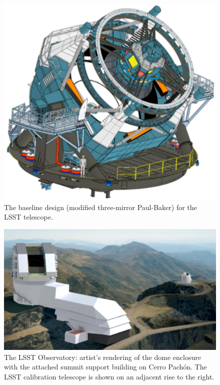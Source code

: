 \documentclass{emulateapj}
\begin{document}
\begin{figure}
\vskip -0.65in
\includegraphics[width=1.0\hsize,clip]{telescopeGreen.pdf}
\vskip -0.65in
\caption{The baseline design (modified three-mirror Paul-Baker) for the 
LSST telescope.} 
\label{Fig:telescope}
\end{figure}


\begin{figure}
\vskip -1.3in
\includegraphics[width=1.0\hsize,clip]{observatoryFull.pdf}
\vskip -1.4in
\caption{The LSST Observatory: artist's rendering of the dome enclosure 
with the attached summit support building on Cerro Pach\'{o}n. The LSST calibration 
telescope is shown on an adjacent rise to the right.} 
\label{Fig:observatory}
\end{figure}
\end{document}
